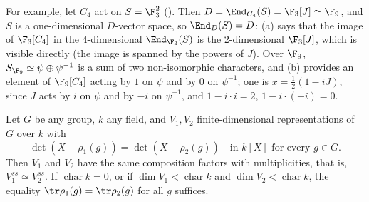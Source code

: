 For example, let $C_4$ act on $S=\F_3^2$ (). Then $D=\End_{C_4}(S)=\F_3[J]\simeq\F_9$, and $S$ is a one-dimensional $D$-vector space,
so $\End_D(S)=D$: (a) says that the image of $\F_3[C_4]$ in the $4$-dimensional $\End_{\F_3}(S)$ is the $2$-dimensional $\F_3[J]$, which is visible
directly (the image is spanned by the powers of $J$). Over $\F_9$, $S_{\F_9}\simeq\psi\oplus\psi^{-1}$ is a sum of two non-isomorphic characters, and (b) provides
an element of $\F_9[C_4]$ acting by $1$ on $\psi$ and by $0$ on $\psi^{-1}$; one is $x=\frac12(1-iJ)$, since $J$ acts by $i$ on $\psi$ and by $-i$ on $\psi^{-1}$, and
$1-i\cdot i=2$, $1-i\cdot(-i)=0$.

\begin{theorem}\label{thm:reps:brauer-nesbitt}
Let $G$ be any group, $k$ any field, and $V_1,V_2$ finite-dimensional representations of $G$ over $k$ with
\[
\det(X-\rho_1(g))=\det(X-\rho_2(g))\quad\text{in }k[X]\text{ for every }g\in G.
\]
Then $V_1$ and $V_2$ have the same composition factors with multiplicities, that is, $V_1^{ss}\simeq V_2^{ss}$. If $\operatorname{char}k=0$, or if
$\dim V_1<\operatorname{char}k$ and $\dim V_2<\operatorname{char}k$, the equality $\tr\rho_1(g)=\tr\rho_2(g)$ for all $g$ suffices.
\end{theorem}

